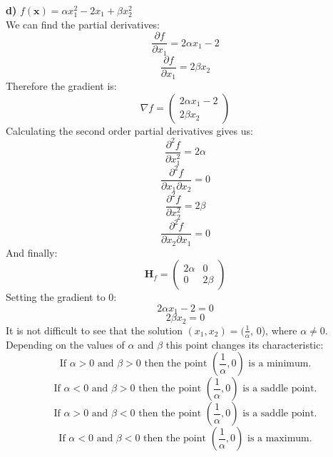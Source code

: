 \documentclass{article}
\begin{document}
\textbf{d)} $f(\boldsymbol{x}) = \alpha x_1^2 - 2x_1 + \beta x_2^2$\\
We can find the partial derivatives:
\begin{equation*}
    \frac{\partial f}{\partial x_1} = 2\alpha x_1 - 2
\end{equation*}
\begin{equation*}
    \frac{\partial f}{\partial x_1} = 2\beta x_2
\end{equation*}
Therefore the gradient is:
\begin{equation*}
    \nabla f = \begin{pmatrix} 2\alpha x_1 - 2\\ 2\beta x_2\end{pmatrix}
\end{equation*}
Calculating the second order partial derivatives gives us:
\begin{equation*}
    \frac{\partial ^2 f}{\partial x_1^2} = 2\alpha
\end{equation*}
\begin{equation*}
    \frac{\partial ^2 f}{\partial x_1 \partial x_2} = 0
\end{equation*}
\begin{equation*}
    \frac{\partial ^2 f}{\partial x_2^2} = 2\beta
\end{equation*}
\begin{equation*}
    \frac{\partial ^2 f}{\partial x_2 \partial x_1} = 0
\end{equation*}
And finally:
\begin{equation*}
    \textbf{H}_f = \begin{pmatrix} 2\alpha & 0\\ 0 & 2\beta \end{pmatrix}
\end{equation*}
Setting the gradient to 0:
\begin{equation*}
    2\alpha x_1 - 2 = 0 
\end{equation*}
\begin{equation*}
    2\beta x_2 = 0
\end{equation*}
It is not difficult to see that the solution $(x_1,x_2) = (\frac{1}{\alpha}$, 0), where $\alpha \neq 0$. Depending on the values of $\alpha$ and $\beta$ this point changes its characteristic:
\begin{equation*}
    \text{If } \alpha > 0 \text{ and } \beta > 0 \text{ then the point } (\frac{1}{\alpha}, 0) \text{ is a minimum.}
\end{equation*}
\begin{equation*}
    \text{If } \alpha < 0 \text{ and } \beta > 0 \text{ then the point } (\frac{1}{\alpha}, 0) \text{ is a saddle point.}
\end{equation*}
\begin{equation*}
    \text{If } \alpha > 0 \text{ and } \beta < 0 \text{ then the point } (\frac{1}{\alpha}, 0) \text{ is a saddle point.}
\end{equation*}
\begin{equation*}
    \text{If } \alpha < 0 \text{ and } \beta < 0 \text{ then the point } (\frac{1}{\alpha}, 0) \text{ is a maximum.}
\end{equation*}
\end{document}
